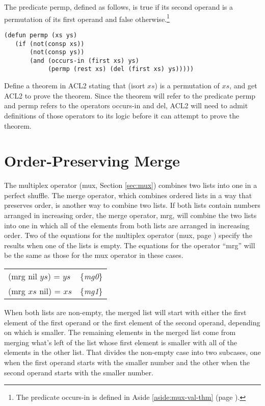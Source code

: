 \begin{ExerciseList}
\Exercise
The predicate 
permp,
defined as follows, is true if its second operand
is a permutation of its first operand and false otherwise.\footnote{The
predicate occurs-in is defined in
Aside \ref{aside:mux-val-thm} (page \pageref{aside:mux-val-thm}).}
\label{defun:permp}
\begin{Verbatim}
(defun permp (xs ys)
   (if (not(consp xs))
       (not(consp ys))
       (and (occurs-in (first xs) ys)
            (permp (rest xs) (del (first xs) ys)))))
\end{Verbatim}
Define a theorem in ACL2 stating that (isort $xs$) is a
permutation of $xs$, and
get ACL2 to prove the theorem.
Since the theorem will refer to the predicate permp
and permp refers to the operators occurs-in and del,
ACL2 will need to admit definitions of those operators
to its logic before it can attempt to prove the theorem.

\end{ExerciseList}

\section{Order-Preserving Merge}
\label{sec:mrg}

The multiplex operator (mux, Section \ref{sec:mux})
combines two lists into one in a perfect shuffle.
The merge operator, which combines ordered lists
in a way that preserves order, is another way to combine two lists.
If both lists contain numbers arranged in increasing order,
the merge operator, mrg,
will combine the two lists
into one in which all of the elements from both lists
are arranged in increasing order.
Two of the equations for the multiplex operator (mux, page \pageref{def:mux})
specify the results when one of the lists is empty.
The equations for the operator ``mrg'' will be the same as those for
the mux operator in these cases.

\begin{center}
\begin{tabular}{ll}
(mrg nil $ys$) = $ys$ & \{\emph{mg0}\} \\
(mrg $xs$ nil) = $xs$ & \{\emph{mg1}\} \\
\end{tabular}
\end{center}

When both lists are non-empty, the merged list will
start with either the first element of the first operand
or the first element of the second operand,
depending on which is smaller.
The remaining elements in the merged list come from
merging what's left of the list whose first element is smaller
with all of the elements in the other list.
That divides the non-empty case into two
subcases, one when the first operand starts with the smaller number
and the other when the second operand starts with the smaller number.

